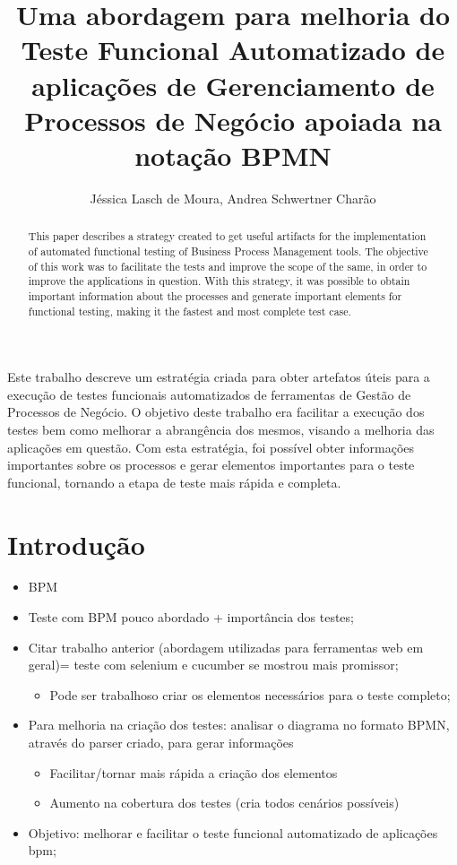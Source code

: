\documentclass[12pt]{article}
\title{Uma abordagem para melhoria do Teste Funcional Automatizado de aplicações de Gerenciamento de Processos de Negócio apoiada na notação BPMN}
\author{Jéssica Lasch de Moura\inst{1}, Andrea Schwertner Charão\inst{1}}
\begin{document}
 

\maketitle

\begin{abstract}
This paper describes a strategy created to get useful artifacts for the implementation of automated functional testing of Business Process Management tools. The objective of this work was to facilitate the tests and improve the scope of the same, in order to improve the applications in question. With this strategy, it was possible to obtain important information about the processes and generate important elements for functional testing, making it the fastest and most complete test case.
\end{abstract}
     
\begin{resumo} 
Este trabalho descreve um estratégia criada para obter artefatos úteis para a execução de testes funcionais automatizados de ferramentas de Gestão de Processos de Negócio. O objetivo deste trabalho era facilitar a execução dos testes bem como melhorar a abrangência dos mesmos, visando a melhoria das aplicações em questão. Com esta estratégia, foi possível obter informações importantes sobre os processos e gerar elementos importantes para o teste funcional, tornando a etapa de teste mais rápida e completa.
\end{resumo}

\section{Introdução}

 \begin{itemize}
   \item BPM
   \item Teste com BPM pouco abordado + importância dos testes;
   \item Citar trabalho anterior (abordagem utilizadas para ferramentas web em geral)= teste com selenium e cucumber se mostrou mais promissor;
   \begin{itemize}
	\item Pode ser trabalhoso criar os elementos necessários para o teste completo;
   \end{itemize}
   \item Para melhoria na criação dos testes: analisar o diagrama no formato BPMN, através do parser criado, para gerar informações
     \begin{itemize}
	\item Facilitar/tornar mais rápida a criação dos elementos
	\item Aumento na cobertura dos testes (cria todos cenários possíveis)
   \end{itemize}
   \item Objetivo:  melhorar e facilitar o teste funcional automatizado de aplicações bpm;
 \end{itemize}
 
\end{document}
